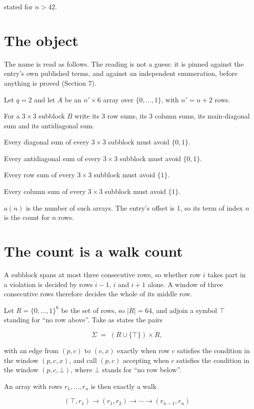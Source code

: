 \documentclass[11pt]{article}
\theoremstyle{definition}
\begin{document}
stated for $n > 42$.

\section{The object}

The name is read as follows. The reading is not a guess: it is pinned against the entry's own published terms, and against an independent enumeration, before anything is proved (Section 7).

Let $q = 2$ and let $A$ be an $n' \times 6$ array over $\{0,\dots,1\}$, with $n' = n + 2$ rows.

For a $3\times3$ subblock $B$ write its 3 row sums, its 3 column sums, its main-diagonal sum and its antidiagonal sum.

Every diagonal sum of every $3\times3$ subblock must avoid $\{0, 1\}$.

Every antidiagonal sum of every $3\times3$ subblock must avoid $\{0, 1\}$.

Every row sum of every $3\times3$ subblock must avoid $\{1\}$.

Every column sum of every $3\times3$ subblock must avoid $\{1\}$.

$a(n)$ is the number of such arrays. The entry's offset is 1, so its term of index $n$ is the count for $n$ rows.

\section{The count is a walk count}

A subblock spans at most three consecutive rows, so whether row $i$ takes part in a violation is decided by rows $i-1$, $i$ and $i+1$ alone. A window of three consecutive rows therefore decides the whole of its middle row.

Let $R = \{0,\dots,1\}^{6}$ be the set of rows, so $|R| = 64$, and adjoin a symbol $\top$ standing for ``no row above''. Take as states the pairs

\[\Sigma \;=\; (R \cup \{\top\}) \times R,\]

with an edge from $(p,c)$ to $(c,x)$ exactly when row $c$ satisfies the condition in the window $(p,c,x)$, and call $(p,c)$ accepting when $c$ satisfies the condition in the window $(p,c,\bot)$, where $\bot$ stands for ``no row below''.

An array with rows $r_1,\dots,r_n$ is then exactly a walk

\[(\top,r_1) \to (r_1,r_2) \to \cdots \to (r_{n-1},r_n)\]
\end{document}
